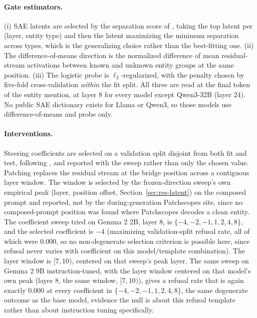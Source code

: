 \documentclass{article}
\newif\ifredflags
\newcommand{\rv}[1]{\ifredflags{\textcolor{red}{\textbf{[VERIFY: #1]}}}\fi}
\begin{document}
\paragraph{Gate estimators.} (i) SAE latents are selected by the separation score of
\citet{ferrando2025entity}, taking the top latent per (layer, entity type) and then the latent
maximizing the minimum separation across types, which is the generalizing choice rather than the
best-fitting one. (ii) The difference-of-means direction is the normalized difference of mean
residual-stream activations between known and unknown entity groups at the same position.
(iii) The logistic probe is $\ell_2$-regularized, with the penalty chosen by five-fold
cross-validation \emph{within} the fit split. All three are read at the final token of the entity
mention, at layer 8 for every model except Qwen3-32B (layer 24). No public SAE dictionary exists for
Llama or Qwen3, so those models use difference-of-means and probe only.

\paragraph{Interventions.} Steering coefficients are selected on a validation split disjoint from
both fit and test, following \citet{ferrando2025entity}, and reported with the sweep rather than only
the chosen value. Patching replaces the residual stream at the bridge position across a contiguous
layer window. The window is selected by the frozen-direction sweep's own empirical peak (layer, position offset,
Section~\ref{sec:res-latent}) on the composed prompt and reported, not by the during-generation
Patchscopes site, since no composed-prompt position was found where Patchscopes decodes a clean
entity. \rv{whether that peak was selected on the validation split or on the held-out split. The
same ambiguity affects BGR's read position (Section~\ref{sec:bgr}) and is the single largest
reproducibility gap in the method.}
The coefficient sweep tried on Gemma 2 2B, layer 8, is $\{-4,-2,-1,1,2,4,8\}$, and the selected
coefficient is $-4$ (maximizing validation-split refusal rate, all of which were $0.000$, so no
non-degenerate selection criterion is possible here, since refusal never varies with coefficient on
this model/template combination). The layer window is $[7,10)$, centered on that sweep's peak layer.
The same sweep on Gemma 2 9B instruction-tuned, with the layer window centered on that model's own
peak (layer 8, the same window, $[7,10)$), gives a refusal rate that is again exactly $0.000$ at every
coefficient in $\{-4,-2,-1,1,2,4,8\}$, the same degenerate outcome as the base model, evidence the
null is about this refusal template rather than about instruction tuning specifically.
\end{document}
